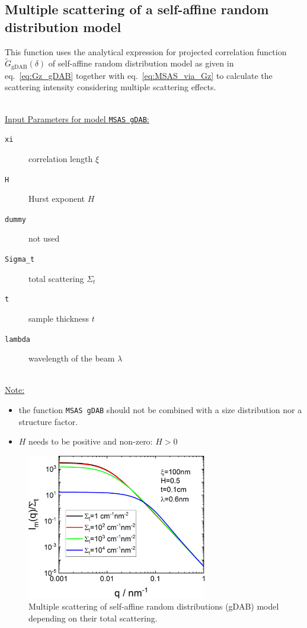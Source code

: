 \newpage
\subsection{Multiple scattering of a self-affine random distribution model}

This function uses the analytical expression for projected correlation function $\tilde{G}_\mathrm{gDAB}(\delta)$ of self-affine random distribution model as given in eq.\ \ref{eq:Gz_gDAB} together with eq.\ \ref{eq:MSAS_via_Gz} to calculate the scattering intensity considering multiple scattering effects.

\hspace{1pt}\\
\underline{Input Parameters for model \texttt{MSAS gDAB}:}\\
\begin{description}
\item[\texttt{xi}] correlation length $\xi$
\item[\texttt{H}] Hurst exponent $H$
\item[\texttt{dummy}] not used
\item[\texttt{Sigma\_t}] total scattering $\Sigma_t$
\item[\texttt{t}] sample thickness $t$
\item[\texttt{lambda}] wavelength of the beam $\lambda$
\end{description}

\hspace{1pt}\\
\underline{Note:}
\begin{itemize}
\item the function \texttt{MSAS gDAB} should not be combined with a size distribution nor a structure factor.
\item $H$ needs to be positive and non-zero: $H > 0$
\end{itemize}

\begin{figure}[htb]
\begin{center}
\includegraphics[width=0.7\textwidth]{../images/form_factor/MSAS/MSAS_gDAB.png}
\end{center}
\caption{Multiple scattering of self-affine random distributions (gDAB) model depending on their total scattering.}
\label{fig:MSAS_gDAB}
\end{figure} 